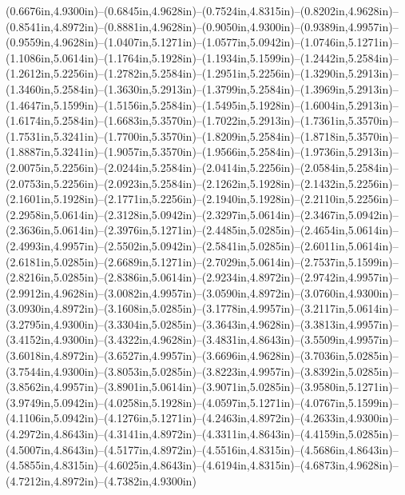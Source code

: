 (0.6676in,4.9300in)--(0.6845in,4.9628in)--(0.7524in,4.8315in)--(0.8202in,4.9628in)--(0.8541in,4.8972in)--(0.8881in,4.9628in)--(0.9050in,4.9300in)--(0.9389in,4.9957in)--(0.9559in,4.9628in)--(1.0407in,5.1271in)--(1.0577in,5.0942in)--(1.0746in,5.1271in)--(1.1086in,5.0614in)--(1.1764in,5.1928in)--(1.1934in,5.1599in)--(1.2442in,5.2584in)--(1.2612in,5.2256in)--(1.2782in,5.2584in)--(1.2951in,5.2256in)--(1.3290in,5.2913in)--(1.3460in,5.2584in)--(1.3630in,5.2913in)--(1.3799in,5.2584in)--(1.3969in,5.2913in)--(1.4647in,5.1599in)--(1.5156in,5.2584in)--(1.5495in,5.1928in)--(1.6004in,5.2913in)--(1.6174in,5.2584in)--(1.6683in,5.3570in)--(1.7022in,5.2913in)--(1.7361in,5.3570in)--(1.7531in,5.3241in)--(1.7700in,5.3570in)--(1.8209in,5.2584in)--(1.8718in,5.3570in)--(1.8887in,5.3241in)--(1.9057in,5.3570in)--(1.9566in,5.2584in)--(1.9736in,5.2913in)--(2.0075in,5.2256in)--(2.0244in,5.2584in)--(2.0414in,5.2256in)--(2.0584in,5.2584in)--(2.0753in,5.2256in)--(2.0923in,5.2584in)--(2.1262in,5.1928in)--(2.1432in,5.2256in)--(2.1601in,5.1928in)--(2.1771in,5.2256in)--(2.1940in,5.1928in)--(2.2110in,5.2256in)--(2.2958in,5.0614in)--(2.3128in,5.0942in)--(2.3297in,5.0614in)--(2.3467in,5.0942in)--(2.3636in,5.0614in)--(2.3976in,5.1271in)--(2.4485in,5.0285in)--(2.4654in,5.0614in)--(2.4993in,4.9957in)--(2.5502in,5.0942in)--(2.5841in,5.0285in)--(2.6011in,5.0614in)--(2.6181in,5.0285in)--(2.6689in,5.1271in)--(2.7029in,5.0614in)--(2.7537in,5.1599in)--(2.8216in,5.0285in)--(2.8386in,5.0614in)--(2.9234in,4.8972in)--(2.9742in,4.9957in)--(2.9912in,4.9628in)--(3.0082in,4.9957in)--(3.0590in,4.8972in)--(3.0760in,4.9300in)--(3.0930in,4.8972in)--(3.1608in,5.0285in)--(3.1778in,4.9957in)--(3.2117in,5.0614in)--(3.2795in,4.9300in)--(3.3304in,5.0285in)--(3.3643in,4.9628in)--(3.3813in,4.9957in)--(3.4152in,4.9300in)--(3.4322in,4.9628in)--(3.4831in,4.8643in)--(3.5509in,4.9957in)--(3.6018in,4.8972in)--(3.6527in,4.9957in)--(3.6696in,4.9628in)--(3.7036in,5.0285in)--(3.7544in,4.9300in)--(3.8053in,5.0285in)--(3.8223in,4.9957in)--(3.8392in,5.0285in)--(3.8562in,4.9957in)--(3.8901in,5.0614in)--(3.9071in,5.0285in)--(3.9580in,5.1271in)--(3.9749in,5.0942in)--(4.0258in,5.1928in)--(4.0597in,5.1271in)--(4.0767in,5.1599in)--(4.1106in,5.0942in)--(4.1276in,5.1271in)--(4.2463in,4.8972in)--(4.2633in,4.9300in)--(4.2972in,4.8643in)--(4.3141in,4.8972in)--(4.3311in,4.8643in)--(4.4159in,5.0285in)--(4.5007in,4.8643in)--(4.5177in,4.8972in)--(4.5516in,4.8315in)--(4.5686in,4.8643in)--(4.5855in,4.8315in)--(4.6025in,4.8643in)--(4.6194in,4.8315in)--(4.6873in,4.9628in)--(4.7212in,4.8972in)--(4.7382in,4.9300in)

